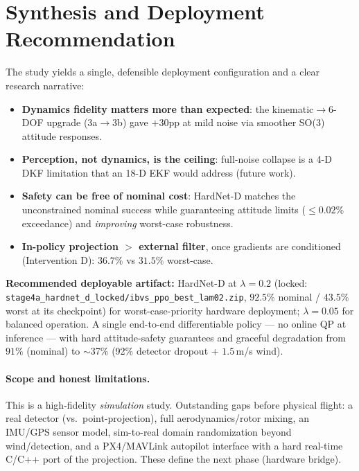 \documentclass[11pt]{article}
\newcommand{\stagebox}[1]{\vspace{2pt}\noindent\colorbox{boxgray}{%
\parbox{\dimexpr\linewidth-2\fboxsep}{\small #1}}\vspace{4pt}}
\begin{document}
\section{Synthesis and Deployment Recommendation}
The study yields a single, defensible deployment configuration and a clear
research narrative:
\begin{itemize}[nosep]
  \item \textbf{Dynamics fidelity matters more than expected}: the
  kinematic$\rightarrow$6-DOF upgrade (3a$\rightarrow$3b) gave $+30$pp at mild
  noise via smoother SO(3) attitude responses.
  \item \textbf{Perception, not dynamics, is the ceiling}: full-noise collapse
  is a 4-D DKF limitation that an 18-D EKF would address (future work).
  \item \textbf{Safety can be free of nominal cost}: HardNet-D matches the
  unconstrained nominal success while guaranteeing attitude limits
  ($\le0.02\%$ exceedance) and \emph{improving} worst-case robustness.
  \item \textbf{In-policy projection $>$ external filter}, once gradients are
  conditioned (Intervention D): $36.7\%$ vs $31.5\%$ worst-case.
\end{itemize}

\stagebox{\textbf{Recommended deployable artifact:} HardNet-D at
$\lambda=0.2$ (locked: \texttt{stage4a\_hardnet\_d\_locked/ibvs\_ppo\_best\_lam02.zip},
$92.5\%$ nominal / $43.5\%$ worst at its checkpoint) for worst-case-priority
hardware deployment; $\lambda=0.05$ for balanced operation. A single
end-to-end differentiable policy --- no online QP at inference --- with hard
attitude-safety guarantees and graceful degradation from $91\%$ (nominal) to
$\sim$37\% (92\% detector dropout + $1.5\,$m/s wind).}

\paragraph{Scope and honest limitations.} This is a high-fidelity
\emph{simulation} study. Outstanding gaps before physical flight: a real
detector (vs.\ point-projection), full aerodynamics/rotor mixing, an IMU/GPS
sensor model, sim-to-real domain randomization beyond wind/detection, and a
PX4/MAVLink autopilot interface with a hard real-time C/C++ port of the
projection. These define the next phase (hardware bridge).
\end{document}
